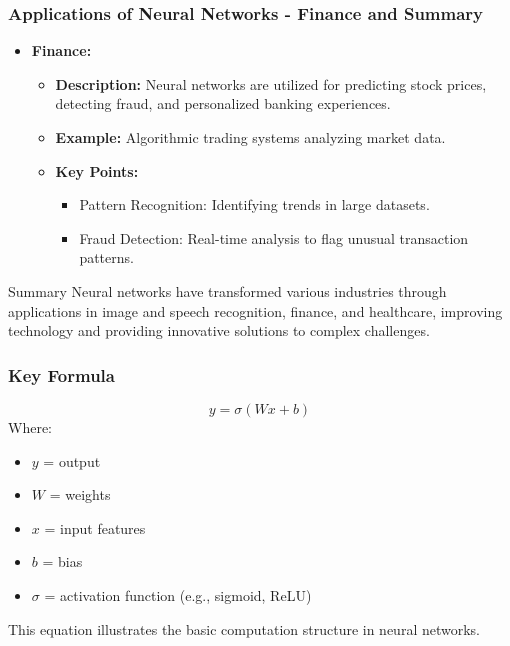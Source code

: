 \documentclass[aspectratio=169]{beamer}
\begin{document}
\begin{frame}[fragile]
    \frametitle{Applications of Neural Networks - Finance and Summary}
    \begin{itemize}
        \item \textbf{Finance:}
            \begin{itemize}
                \item \textbf{Description:} Neural networks are utilized for predicting stock prices, detecting fraud, and personalized banking experiences.
                \item \textbf{Example:} Algorithmic trading systems analyzing market data.
                \item \textbf{Key Points:}
                    \begin{itemize}
                        \item Pattern Recognition: Identifying trends in large datasets.
                        \item Fraud Detection: Real-time analysis to flag unusual transaction patterns.
                    \end{itemize}
            \end{itemize}
    \end{itemize}
    \begin{block}{Summary}
        Neural networks have transformed various industries through applications in image and speech recognition, finance, and healthcare, improving technology and providing innovative solutions to complex challenges.
    \end{block}
\end{frame}

\begin{frame}[fragile]
    \frametitle{Key Formula}
    \begin{equation}
        y = \sigma(Wx + b)
    \end{equation}
    Where:
    \begin{itemize}
        \item \(y\) = output
        \item \(W\) = weights
        \item \(x\) = input features
        \item \(b\) = bias
        \item \(\sigma\) = activation function (e.g., sigmoid, ReLU)
    \end{itemize}
    This equation illustrates the basic computation structure in neural networks.
\end{frame}
\end{document}
